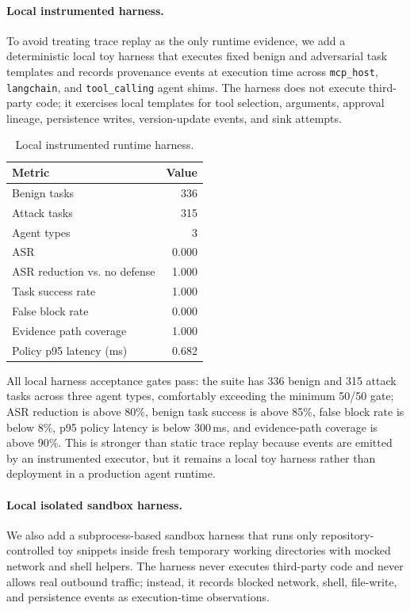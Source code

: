 \documentclass[10pt]{article}
\begin{document}
\paragraph{Local instrumented harness.}
To avoid treating trace replay as the only runtime evidence, we add a deterministic local toy harness that executes fixed benign and adversarial task templates and records provenance events at execution time across \texttt{mcp\_host}, \texttt{langchain}, and \texttt{tool\_calling} agent shims. The harness does not execute third-party code; it exercises local templates for tool selection, arguments, approval lineage, persistence writes, version-update events, and sink attempts.

\begin{table}[t]
\centering
\caption{Local instrumented runtime harness.}
\label{tab:runtime_harness}
\begin{tabular}{lr}
\toprule
Metric & Value \\
\midrule
Benign tasks & 336 \\
Attack tasks & 315 \\
Agent types & 3 \\
ASR & 0.000 \\
ASR reduction vs. no defense & 1.000 \\
Task success rate & 1.000 \\
False block rate & 0.000 \\
Evidence path coverage & 1.000 \\
Policy p95 latency (ms) & 0.682 \\
\bottomrule
\end{tabular}
\end{table}

All local harness acceptance gates pass: the suite has 336 benign and 315 attack tasks across three agent types, comfortably exceeding the minimum 50/50 gate; ASR reduction is above 80\%, benign task success is above 85\%, false block rate is below 8\%, p95 policy latency is below 300\,ms, and evidence-path coverage is above 90\%. This is stronger than static trace replay because events are emitted by an instrumented executor, but it remains a local toy harness rather than deployment in a production agent runtime.

\paragraph{Local isolated sandbox harness.}
We also add a subprocess-based sandbox harness that runs only repository-controlled toy snippets inside fresh temporary working directories with mocked network and shell helpers. The harness never executes third-party code and never allows real outbound traffic; instead, it records blocked network, shell, file-write, and persistence events as execution-time observations.
\end{document}
